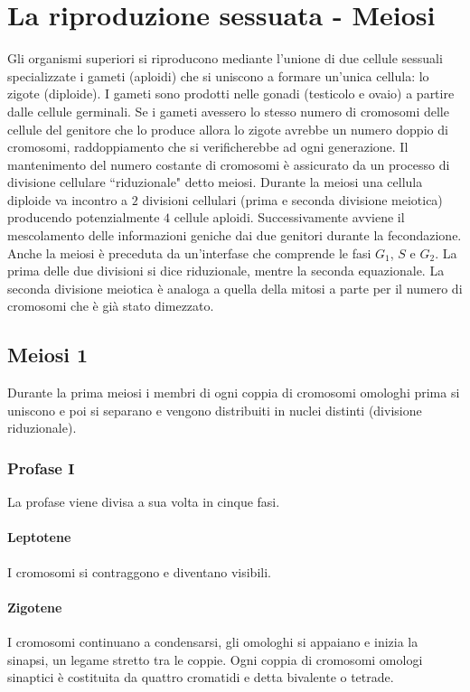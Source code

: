 \section{La riproduzione sessuata - Meiosi}
Gli organismi superiori si riproducono mediante l'unione di due cellule sessuali specializzate i gameti (aploidi) che si uniscono a formare un'unica cellula: lo zigote (diploide). I 
gameti sono prodotti nelle gonadi (testicolo e ovaio) a partire dalle cellule germinali. Se i gameti avessero lo stesso numero di cromosomi delle cellule del genitore che lo produce 
allora lo zigote avrebbe un numero doppio di cromosomi, raddoppiamento che si verificherebbe ad ogni generazione. Il mantenimento del numero costante di cromosomi \`e assicurato da
un processo di divisione cellulare ``riduzionale" detto meiosi. Durante la meiosi una cellula diploide va incontro a $2$ divisioni cellulari (prima e seconda divisione meiotica) 
producendo potenzialmente $4$ cellule aploidi. Successivamente avviene il mescolamento delle informazioni geniche dai due genitori durante la fecondazione. Anche la meiosi \`e preceduta da un'interfase
che comprende le fasi $G_1$, $S$ e $G_2$. La prima delle due divisioni si dice riduzionale, mentre la seconda equazionale. La seconda divisione meiotica \`e analoga a quella della mitosi a parte per il
numero di cromosomi che \`e gi\`a stato dimezzato.
\subsection{Meiosi $\mathbf{1}$}
Durante la prima meiosi i membri di ogni coppia di cromosomi omologhi prima si uniscono e poi si separano e vengono distribuiti in nuclei distinti (divisione riduzionale). 
\subsubsection{Profase $\mathbf{I}$}
La profase viene divisa a sua volta in cinque fasi.
\paragraph{Leptotene}
I cromosomi si contraggono e diventano visibili.
\paragraph{Zigotene}
I cromosomi continuano a condensarsi, gli omologhi si appaiano e inizia la sinapsi, un legame stretto tra le coppie. Ogni coppia di cromosomi omologi sinaptici \`e costituita da quattro cromatidi e 
detta bivalente o tetrade.
